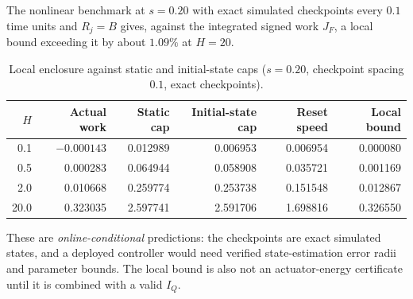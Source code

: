 \documentclass[11pt,notitlepage]{report}
\theoremstyle{definition}
\theoremstyle{remark}
\begin{document}
The nonlinear benchmark at $s=0.20$ with exact simulated checkpoints every $0.1$ time units and $R_j=B$ gives, against the integrated signed work $J_F$, a local bound exceeding it by about $1.09\%$ at $H=20$.
\begin{table}[ht]\centering\small
\caption{Local enclosure against static and initial-state caps ($s=0.20$, checkpoint spacing $0.1$, exact checkpoints).}
\begin{tabular}{rrrrrr}\toprule
$H$&Actual work&Static cap&Initial-state cap&Reset speed&Local bound\\\midrule
0.1&$-0.000143$&0.012989&0.006953&0.006954&0.000080\\
0.5&0.000283&0.064944&0.058908&0.035721&0.001169\\
2.0&0.010668&0.259774&0.253738&0.151548&0.012867\\
20.0&0.323035&2.597741&2.591706&1.698816&0.326550\\\bottomrule
\end{tabular}
\end{table}
These are \emph{online-conditional} predictions: the checkpoints are exact simulated states, and a deployed controller would need verified state-estimation error radii and parameter bounds. The local bound is also not an actuator-energy certificate until it is combined with a valid $I_Q$.
\end{document}
